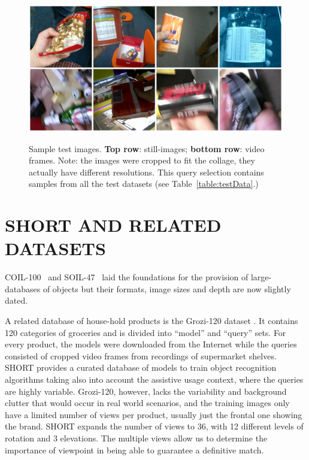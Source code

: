 \begin{figure}
\centering
\includegraphics[width=.75\linewidth]{./gfx/Chapter03/icip-test-imgs2.jpg}\label{fig:testSetCollage}
\caption{Sample test images. \textbf{Top row}: still-images; \textbf{bottom row}: video frames. Note: the images were cropped to fit the collage, they actually have different resolutions. This query selection contains samples from all the test datasets (see Table~\ref{table:testData}.)}
\label{fig:short-30}
\end{figure}

\section{SHORT AND RELATED DATASETS} \label{sec:related-work}

COIL-100~\cite{Nene1996a} and SOIL-47~\cite{Koubaroulis2002} laid the foundations for the provision of large-databases of objects but their formats, image sizes and depth are now slightly dated.

A related database of house-hold products is the Grozi-120 dataset \cite{Merler2007}. It contains 120 categories of groceries and is divided into ``model'' and ``query'' sets. For every product, the models were downloaded from the Internet while the queries consisted of cropped video frames from recordings of supermarket shelves. SHORT provides a curated database of models to train object recognition algorithms taking also into account the assistive usage context, where the queries are highly variable. Grozi-120, however, lacks the variability and background clutter that would occur in real world scenarios, and the training images only have a limited number of views per product, usually just the frontal one showing the brand. SHORT expands the number of views to 36, with 12 different levels of rotation and 3 elevations.  The multiple views allow us to determine the importance of viewpoint in being able to guarantee a definitive match. 

